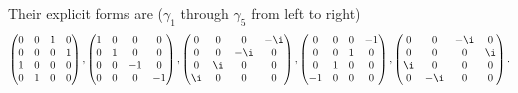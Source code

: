 \documentclass[english, parskip=full]{scrartcl}
\begin{document}
Their explicit forms are ($\gamma_1$ through $\gamma_5$ from left to right)
\begin{align}
\begin{pmatrix} 0 & 0 & 1 & 0 \\ 0 & 0 & 0 & 1 \\ 1 & 0 & 0 & 0 \\ 0 & 1 & 0 & 0 \\  \end{pmatrix},
\begin{pmatrix} 1 & 0 & 0 & 0 \\ 0 & 1 & 0 & 0 \\ 0 & 0 & -1 & 0 \\ 0 & 0 & 0 & -1 \\  \end{pmatrix},
\begin{pmatrix} 0 & 0 & 0 & -\i \\ 0 & 0 & -\i & 0 \\ 0 & \i & 0 & 0 \\ \i & 0 & 0 & 0 \\  \end{pmatrix},
\begin{pmatrix} 0 & 0 & 0 & -1 \\ 0 & 0 & 1 & 0 \\ 0 & 1 & 0 & 0 \\ -1 & 0 & 0 & 0 \\  \end{pmatrix},
\begin{pmatrix} 0 & 0 & -\i & 0 \\ 0 & 0 & 0 & \i \\ \i & 0 & 0 & 0 \\ 0 & -\i & 0 & 0 \\  \end{pmatrix}.
\end{align}
\end{document}
